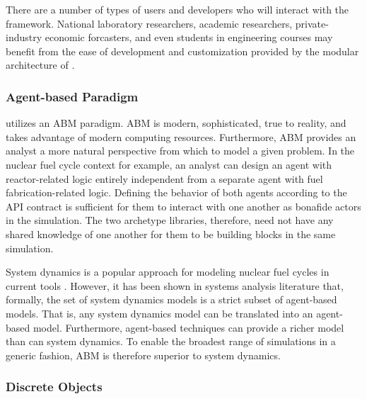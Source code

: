 There are a number of types of users and developers who will 
interact with the \Cyclus framework. National laboratory researchers,
academic researchers, private-industry economic forcasters, and even students 
in engineering courses may benefit from the ease of development and
customization provided by the modular architecture of \Cyclus.

\subsubsection{Agent-based Paradigm}

\Cyclus utilizes an \gls{ABM} paradigm.  \gls{ABM} is modern, sophisticated, 
true to reality, and takes advantage of modern computing resources.  
Furthermore, \gls{ABM} provides an analyst a more natural 
perspective from which to model a given problem. In the nuclear fuel cycle 
context for example, an analyst can design an agent with reactor-related logic 
entirely independent from a separate agent with fuel fabrication-related 
logic. Defining the behavior of both agents according to the 
\gls{API} contract is sufficient for them to interact with one another as 
bonafide actors in the simulation.  The two archetype libraries, therefore, need 
not have any shared knowledge of one another for them to be building blocks in 
the same simulation.

System dynamics is a popular approach for modeling nuclear fuel cycles in current
tools 
\cite{jacobson_vision_2009,van_den_durpel_daness_2009,guerin_impact_2009,guerin_benchmark_2009}. However, it has been shown in systems analysis literature
\cite{macal_agent-based_2010} that, formally, the
set of system dynamics models is a strict subset of agent-based models.
That is, any system dynamics model can be translated
into an agent-based model. Furthermore, agent-based
techniques can provide a richer model than can system dynamics. To enable the 
broadest range of simulations in a generic fashion, \gls{ABM} is therefore 
superior to system dynamics. 

\subsubsection{Discrete Objects}

